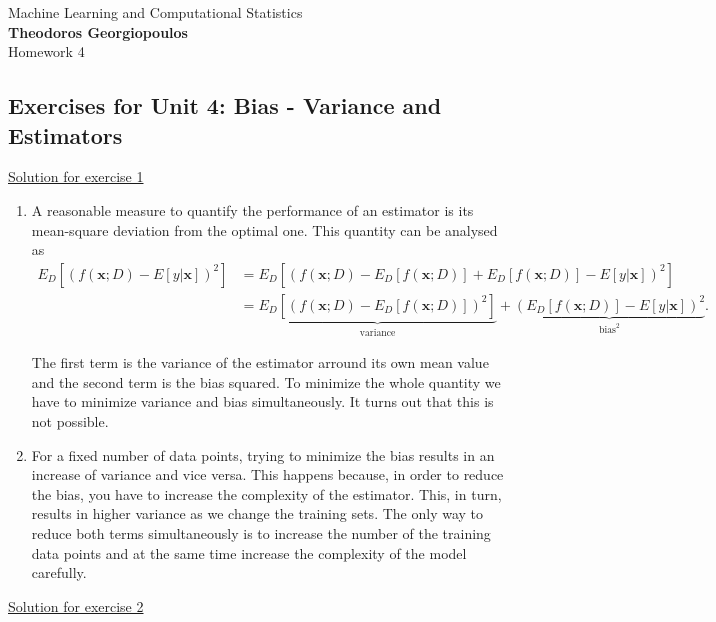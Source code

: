 \documentclass[12pt]{book}
\begin{document}
\begin{center}
{\Large Machine Learning and Computational Statistics}\\
\large\textbf{Theodoros Georgiopoulos}\\ %
\Large Homework 4 %
\end{center}

\vspace{0.2 cm}
\subsection*{Exercises for Unit 4: Bias - Variance and Estimators}
\vspace{0.2 cm}

{\underline{\large Solution for exercise 1}}
\vspace{0.1 cm}

\noindent
\begin{enumerate}[label=(\alph*)]
\item A reasonable measure to quantify the performance of an estimator is its mean-square deviation from the optimal one. This quantity can be analysed as
\begin{align*}
E_D \left[(f(\pmb{x};D) - E[y|\pmb{x}])^2\right] &= E_D \left[(f(\pmb{x};D) - E_D[f(\pmb{x};D)] + E_D[f(\pmb{x};D)] - E[y|\pmb{x}])^2\right] \\
&= \underbrace{E_D \left[(f(\pmb{x};D) - E_D[f(\pmb{x};D)] )^2\right]}_\text{variance} + \underbrace{\left(E_D[f(\pmb{x};D)] - E[y|\pmb{x}]\right)^2}_{\text{bias}^2}.
\end{align*}

The first term is the variance of the estimator arround its own mean value and the second term is the bias squared. To minimize the whole quantity we have to minimize variance and bias simultaneously. It turns out that this is not possible.
\item For a fixed number of data points, trying to minimize the bias results in an increase of variance and vice versa. This happens because, in order to reduce the bias, you have to increase the complexity of the estimator. This, in turn, results in higher variance as we change the training sets. The only way to reduce both terms simultaneously is to increase the number of the training data points and at the same time increase the complexity of the model carefully. 
\end{enumerate}


{\underline{\large Solution for exercise 2}}
\vspace{0.3 cm}
\end{document}
